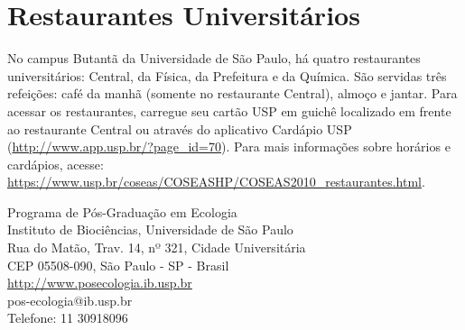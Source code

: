 \documentclass[twoside a4paper 12pt]{report}
\begin{document}
\section{Restaurantes Universitários}\label{Restaurantes Universitários}

No campus Butantã da Universidade de São Paulo, há quatro restaurantes universitários: Central, da Física, da Prefeitura e da Química. São servidas três refeições: café da manhã (somente no restaurante Central), almoço e jantar. Para acessar os restaurantes, carregue seu cartão USP em guichê localizado em frente ao restaurante Central ou através do aplicativo Cardápio USP ({\url{http://www.app.usp.br/?page_id=70}}). Para mais informações sobre horários e cardápios, acesse: {\url{https://www.usp.br/coseas/COSEASHP/COSEAS2010_restaurantes.html}}.



\newpage
\pagestyle{empty}
\cleardoublepage

\vspace*{\fill} 
\begin{flushright}
\begin{spacing}{1.1}
{\large Programa de Pós-Graduação em Ecologia\\
Instituto de Biociências, Universidade de São Paulo\\
Rua do Matão, Trav. 14, nº 321, Cidade Universitária\\
CEP 05508-090, São Paulo - SP - Brasil\\[1.5em]
\url{http://www.posecologia.ib.usp.br}\\
pos-ecologia@ib.usp.br \\ 
Telefone: 11 30918096\\
}
\end{spacing}  
\end{flushright}
\end{document}
